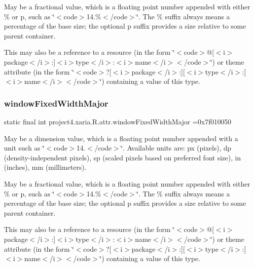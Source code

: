 May be a fractional value, which is a floating point number appended with either \% or p, such as \char`\"{}$<$code$>$14.\%$<$/code$>$\char`\"{}. The \% suffix always means a percentage of the base size; the optional p suffix provides a size relative to some parent container. 

This may also be a reference to a resource (in the form \char`\"{}$<$code$>$@\mbox{[}$<$i$>$package$<$/i$>$\+:\mbox{]}$<$i$>$type$<$/i$>$\+:$<$i$>$name$<$/i$>$$<$/code$>$\char`\"{}) or theme attribute (in the form \char`\"{}$<$code$>$?\mbox{[}$<$i$>$package$<$/i$>$\+:\mbox{]}\mbox{[}$<$i$>$type$<$/i$>$\+:\mbox{]}$<$i$>$name$<$/i$>$$<$/code$>$\char`\"{}) containing a value of this type. \mbox{\label{classproject4_1_1xaria_1_1R_1_1attr_ae5831b0a31d4458b723871022f7e8d58}} 
\subsubsection{\texorpdfstring{window\+Fixed\+Width\+Major}{windowFixedWidthMajor}}
{\footnotesize\ttfamily static final int project4.\+xaria.\+R.\+attr.\+window\+Fixed\+Width\+Major =0x7f010050\hspace{0.3cm}{\ttfamily [static]}}

May be a dimension value, which is a floating point number appended with a unit such as \char`\"{}$<$code$>$14.\+5sp$<$/code$>$\char`\"{}. Available units are\+: px (pixels), dp (density-\/independent pixels), sp (scaled pixels based on preferred font size), in (inches), mm (millimeters). 

May be a fractional value, which is a floating point number appended with either \% or p, such as \char`\"{}$<$code$>$14.\%$<$/code$>$\char`\"{}. The \% suffix always means a percentage of the base size; the optional p suffix provides a size relative to some parent container. 

This may also be a reference to a resource (in the form \char`\"{}$<$code$>$@\mbox{[}$<$i$>$package$<$/i$>$\+:\mbox{]}$<$i$>$type$<$/i$>$\+:$<$i$>$name$<$/i$>$$<$/code$>$\char`\"{}) or theme attribute (in the form \char`\"{}$<$code$>$?\mbox{[}$<$i$>$package$<$/i$>$\+:\mbox{]}\mbox{[}$<$i$>$type$<$/i$>$\+:\mbox{]}$<$i$>$name$<$/i$>$$<$/code$>$\char`\"{}) containing a value of this type. \mbox{\label{classproject4_1_1xaria_1_1R_1_1attr_a30da977f5432ea01fe0dea2704d8c7cb}} 
